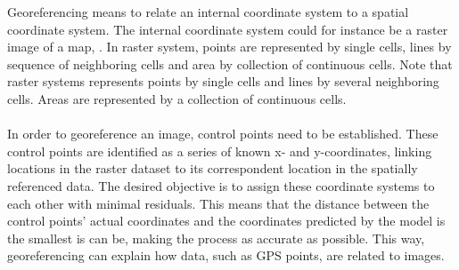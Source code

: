 Georeferencing means to relate an internal coordinate system to a spatial coordinate system. The internal coordinate system could for instance be a raster image of a map, \cite{arcmap_2016}. In raster system, points are represented by single cells, lines by sequence of neighboring cells and area by collection of continuous cells. \cite{gisresources_2013}
Note that raster systems represents points by single cells and lines by several neighboring cells. Areas are represented by a collection of continuous cells. 
\\\\
In order to georeference an image, control points need to be established. These control points are identified as a series of known x- and y-coordinates, linking locations in the raster dataset to its correspondent location in the spatially referenced data. The desired objective is to assign these coordinate systems to each other with minimal residuals. This means that the distance between the control points’ actual coordinates and the coordinates predicted by the model is the smallest is can be, making the process as accurate as possible. This way, georeferencing can explain how data, such as GPS points, are related to images. \cite{arcmap_2016}


